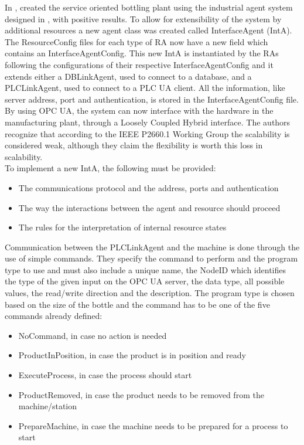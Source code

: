 In \cite{bottling_plant_part2}, \citeauthor{bottling_plant_part2} created the service oriented bottling plant using the industrial agent system designed in \cite{bottling_plant_part1}, with positive results. To allow for extensibility of the system by additional resources a new agent class was created called InterfaceAgent (IntA). The ResourceConfig files for each type of RA now have a new field which contains an InterfaceAgentConfig. This new IntA is instantiated by the RAs following the configurations of their respective InterfaceAgentConfig and it extends either a DBLinkAgent, used to connect to a database, and a PLCLinkAgent, used to connect to a PLC UA client. All the information, like server address, port and authentication, is stored in the InterfaceAgentConfig file. By using OPC UA, the system can now interface with the hardware in the manufacturing plant, through a Loosely Coupled Hybrid interface. The authors recognize that according to the IEEE P2660.1 Working Group the scalability is considered weak, although they claim the flexibility is worth this loss in scalability.\\

To implement a new IntA, the following must be provided:
\begin{itemize}
	\item The communications protocol and the address, ports and authentication
	\item The way the interactions between the agent and resource should proceed
	\item The rules for the interpretation of internal resource states
\end{itemize}

Communication between the PLCLinkAgent and the machine is done through the use of simple commands. They specify the command to perform and the program type to use and must also include a unique name, the NodeID which identifies the type of the given input on the OPC UA server, the data type, all possible values, the read/write direction and the description. The program type is chosen based on the size of the bottle and the command has to be one of the five commands already defined:

\begin{itemize}
	\item NoCommand, in case no action is needed
	\item ProductInPosition, in case the product is in position and ready
	\item ExecuteProcess, in case the process should start
	\item ProductRemoved, in case the product needs to be removed from the machine/station
	\item PrepareMachine, in case the machine needs to be prepared for a process to start
\end{itemize}

